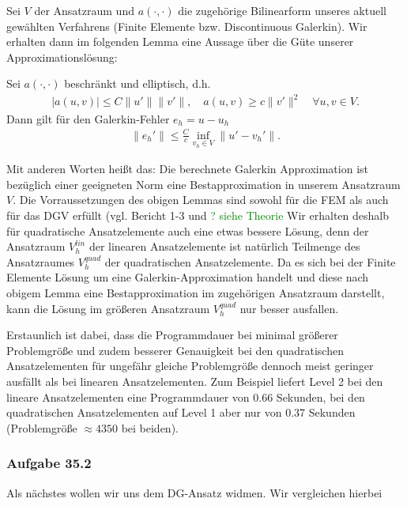 Sei $V$ der Ansatzraum und $a(\cdot,\cdot)$ die zugehörige Bilinearform unseres aktuell gewählten Verfahrens (Finite Elemente bzw. Discontinuous Galerkin).
Wir erhalten dann im folgenden Lemma eine Aussage über die Güte unserer Approximationslösung:

\begin{Lemma}
  Sei $a(\cdot,\cdot)$ beschränkt und elliptisch, d.h.
  \begin{align*}
    |a(u,v)| \le C \|u'\| \|v'\|, \quad a(u,v) \ge c \| v'\|^2
    \quad \forall u,v \in V.
  \end{align*}
  Dann gilt für den Galerkin-Fehler $e_h = u-u_h$
  \begin{align*}
    \| e_h' \| \le \frac{C}{c} \inf\limits_{v_h \in V}
    \| u'-v_h' \|.
  \end{align*}
\end{Lemma}
Mit anderen Worten heißt das: Die berechnete Galerkin Approximation ist bezüglich einer geeigneten Norm eine Bestapproximation in unserem Ansatzraum $V$.
Die Vorraussetzungen des obigen Lemmas sind sowohl für die FEM als auch für das DGV erfüllt (vgl. Bericht 1-3 und
\textcolor{green}{ ? siehe Theorie }
Wir erhalten deshalb für quadratische Ansatzelemente auch eine etwas bessere Lösung, denn der Ansatzraum $V_h^{lin}$ der linearen Ansatzelemente ist natürlich Teilmenge des Ansatzraumes $V_h^{quad}$ der quadratischen Ansatzelemente. Da es sich bei der Finite Elemente Lösung um eine Galerkin-Approximation handelt und diese nach obigem Lemma eine Bestapproximation im zugehörigen Ansatzraum darstellt, kann die Lösung im größeren Ansatzraum $V_h^{quad}$ nur besser ausfallen.

Erstaunlich ist dabei, dass die Programmdauer bei minimal größerer Problemgröße und zudem besserer Genauigkeit bei den quadratischen Ansatzelementen für ungefähr gleiche Problemgröße dennoch meist geringer ausfällt als bei linearen Ansatzelementen. Zum Beispiel liefert Level 2 bei den lineare Ansatzelementen eine Programmdauer von 0.66 Sekunden, bei den quadratischen Ansatzelementen auf Level 1 aber nur von 0.37 Sekunden (Problemgröße $\approx 4350$ bei beiden).



\subsubsection{Aufgabe 35.2}
Als nächstes wollen wir uns dem DG-Ansatz widmen. Wir vergleichen hierbei  

